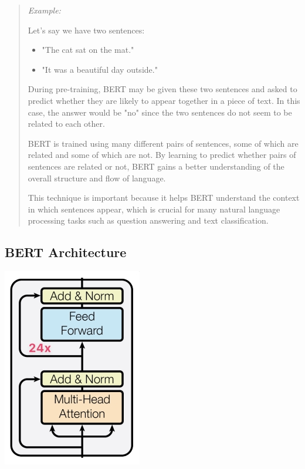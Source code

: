 \begin{quote}
\textit{Example:}

Let's say we have two sentences:

\begin{itemize}
    \item "The cat sat on the mat."
    \item "It was a beautiful day outside."
\end{itemize}
During pre-training, BERT may be given these two sentences and asked to predict whether they are likely to appear together in a piece of text. In this case, the answer would be "no" since the two sentences do not seem to be related to each other.

BERT is trained using many different pairs of sentences, some of which are related and some of which are not. By learning to predict whether pairs of sentences are related or not, BERT gains a better understanding of the overall structure and flow of language.

This technique is important because it helps BERT understand the context in which sentences appear, which is crucial for many natural language processing tasks such as question answering and text classification.

\end{quote}

\subsection{BERT Architecture}
\includegraphics[width=0.5\linewidth]{bert.jpeg}

